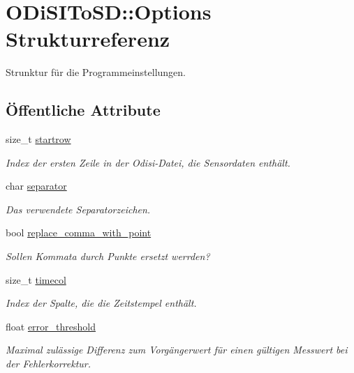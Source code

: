 \hypertarget{structODiSIToSD_1_1Options}{\section{O\-Di\-S\-I\-To\-S\-D\-:\-:Options Strukturreferenz}
\label{structODiSIToSD_1_1Options}
}


Strunktur für die Programmeinstellungen.  


\subsection*{Öffentliche Attribute}
\begin{DoxyCompactItemize}
\item 
size\-\_\-t \hyperlink{structODiSIToSD_1_1Options_ac5138441572e68637dee8052f3c97240}{startrow}
\begin{DoxyCompactList}\small\item\em Index der ersten Zeile in der Odisi-\/\-Datei, die Sensordaten enthält. \end{DoxyCompactList}\item 
char \hyperlink{structODiSIToSD_1_1Options_a5621362ac3b707242893629db592f994}{separator}
\begin{DoxyCompactList}\small\item\em Das verwendete Separatorzeichen. \end{DoxyCompactList}\item 
bool \hyperlink{structODiSIToSD_1_1Options_a5a14dc70f56c2ba965fc1af42a903c17}{replace\-\_\-comma\-\_\-with\-\_\-point}
\begin{DoxyCompactList}\small\item\em Sollen Kommata durch Punkte ersetzt werrden? \end{DoxyCompactList}\item 
size\-\_\-t \hyperlink{structODiSIToSD_1_1Options_a63e45d6a87805ab4bfe9582e37f6c999}{timecol}
\begin{DoxyCompactList}\small\item\em Index der Spalte, die die Zeitstempel enthält. \end{DoxyCompactList}\item 
float \hyperlink{structODiSIToSD_1_1Options_a3df2be923e13ab5f3727bd7975a5c37c}{error\-\_\-threshold}
\begin{DoxyCompactList}\small\item\em Maximal zulässige Differenz zum Vorgängerwert für einen gültigen Messwert bei der Fehlerkorrektur. \end{DoxyCompactList}\item 

\end{DoxyCompactItemize}
